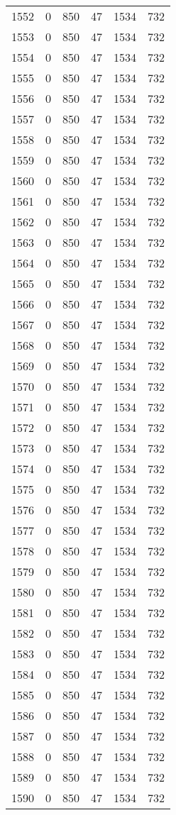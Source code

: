 \documentclass[a4paper]{ctexart}
\begin{document}
\begin{longtable}{p{1cm}|p{2cm}|p{2cm}|p{2cm}|P{2cm}|p{2cm}}
		1552&0&850&47&1534&732\\
		1553&0&850&47&1534&732\\
		1554&0&850&47&1534&732\\
		1555&0&850&47&1534&732\\
		1556&0&850&47&1534&732\\
		1557&0&850&47&1534&732\\
		1558&0&850&47&1534&732\\
		1559&0&850&47&1534&732\\
		1560&0&850&47&1534&732\\
		1561&0&850&47&1534&732\\
		1562&0&850&47&1534&732\\
		1563&0&850&47&1534&732\\
		1564&0&850&47&1534&732\\
		1565&0&850&47&1534&732\\
		1566&0&850&47&1534&732\\
		1567&0&850&47&1534&732\\
		1568&0&850&47&1534&732\\
		1569&0&850&47&1534&732\\
		1570&0&850&47&1534&732\\
		1571&0&850&47&1534&732\\
		1572&0&850&47&1534&732\\
		1573&0&850&47&1534&732\\
		1574&0&850&47&1534&732\\
		1575&0&850&47&1534&732\\
		1576&0&850&47&1534&732\\
		1577&0&850&47&1534&732\\
		1578&0&850&47&1534&732\\
		1579&0&850&47&1534&732\\
		1580&0&850&47&1534&732\\
		1581&0&850&47&1534&732\\
		1582&0&850&47&1534&732\\
		1583&0&850&47&1534&732\\
		1584&0&850&47&1534&732\\
		1585&0&850&47&1534&732\\
		1586&0&850&47&1534&732\\
		1587&0&850&47&1534&732\\
		1588&0&850&47&1534&732\\
		1589&0&850&47&1534&732\\
		1590&0&850&47&1534&732\\

\end{longtable}
\end{document}
